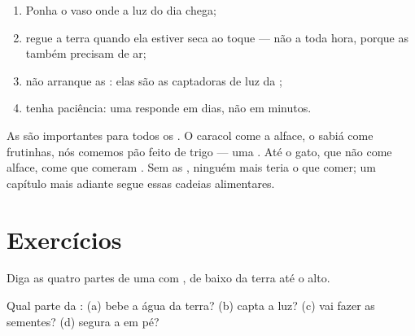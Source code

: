 \begin{method}\label{met:g1:plants-around-us:care}
\begin{enumerate}
  \item Ponha o vaso onde a luz do dia chega;
  \item regue a terra quando ela estiver seca ao toque --- não a
        toda hora, porque as  também precisam de ar;
  \item não arranque as : elas são as captadoras de luz da
        ;
  \item tenha paciência: uma  responde em dias, não em minutos.
\end{enumerate}
\end{method}

\begin{remark}\label{rem:g1:plants-around-us:food}
As  são importantes para todos os . O caracol come a
alface, o sabiá come frutinhas, nós comemos pão feito de trigo ---
uma . Até o gato, que não come alface, come  que
comeram . Sem as , ninguém mais teria o que comer; um
capítulo mais adiante segue essas cadeias alimentares.
\end{remark}

\section{Exercícios}

\begin{exercise}[$\star$]\label{exo:g1:plants-around-us:1}
Diga as quatro partes de uma  com , de baixo da terra até
o alto.
\end{exercise}

\begin{exercise}[$\star$]\label{exo:g1:plants-around-us:2}
Qual parte da : (a) bebe a água da terra? (b) capta a luz?
(c) vai fazer as sementes? (d) segura a  em pé?
\end{exercise}

